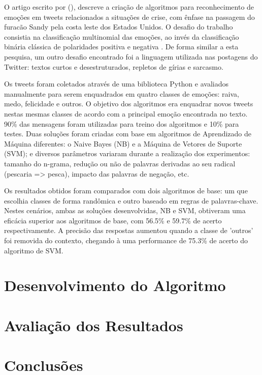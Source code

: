 \documentclass[
	12pt,				%
	openright,			%
	oneside,			%
	a4paper,			%
	english,			%
	spanish,			%
	brazil				%
	]{abntex2}
\begin{document}
O artigo escrito por  (\citeyear{article_tweet_crisis}), descreve a criação de algoritmos para reconhecimento de emoções em tweets relacionados a situações de crise, com ênfase na passagem do furacão Sandy pela costa leste dos Estados Unidos. O desafio do trabalho consistia na classificação multinomial das emoções, ao invés da classificação binária clássica de polaridades positiva e negativa \cite{article_sentiment_twitter}. De forma similar a esta pesquisa, um outro desafio encontrado foi a linguagem utilizada nas postagens do Twitter: textos curtos e desestruturados, repletos de gírias e sarcasmo.

Os tweets foram coletados através de uma biblioteca Python e avaliados manualmente para serem enquadrados em quatro classes de emoções: raiva, medo, felicidade e outros. O objetivo dos algoritmos era enquadrar novos tweets nestas mesmas classes de acordo com a principal emoção encontrada no texto. 90\% das mensagens foram utilizadas para treino dos algoritmos e 10\% para testes. Duas soluções foram criadas com base em algoritmos de  Aprendizado de Máquina diferentes: o Naive Bayes (NB) e a Máquina de Vetores de Suporte (SVM); e diversos parâmetros variaram durante a realização dos experimentos: tamanho do n-grama, redução ou não de palavras derivadas ao seu radical (pescaria => pesca), impacto das palavras de negação, etc. 

Os resultados obtidos foram comparados com dois algoritmos de base: um que escolhia classes de forma randômica e outro baseado em regras de palavras-chave. Nestes cenários, ambas as soluções desenvolvidas, NB e SVM, obtiveram uma eficácia superior aos algoritmos de base, com 56.5\% e 59.7\% de acerto respectivamente. A precisão das respostas aumentou quando a classe de 'outros' foi removida do contexto, chegando à uma performance de 75.3\% de acerto do algoritmo de SVM. 

	
	\chapter{Desenvolvimento do Algoritmo}
	\chapter{Avaliação dos Resultados}
	\chapter{Conclusões}
	 
\end{document}
